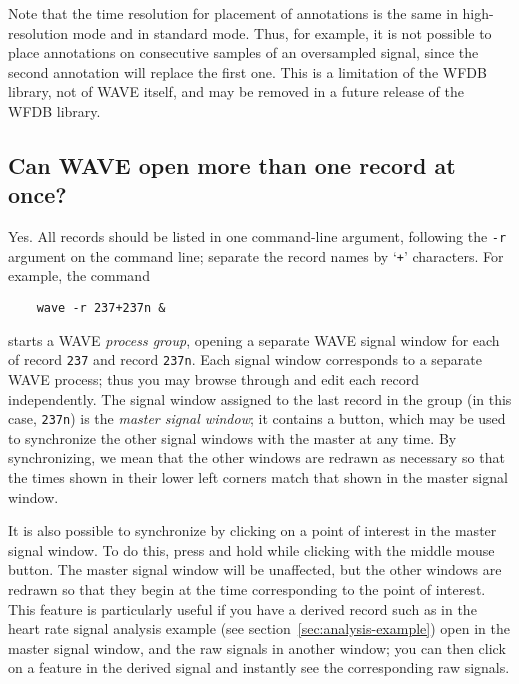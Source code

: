 \documentclass[twoside]{book}
\newcommand{\keycap}[1]{\cornersize{.5}\Ovalbox{\small\sf #1}}
\newcommand{\button}[1]{\cornersize{2}\ovalbox{\rule[-.3mm]{0cm}{2.5mm}\small\sf ~#1~}}
\newcommand{\WAVE}{{\sf WAVE}\xspace}
\begin{document}
Note that the time resolution for placement of annotations is the same
in high-resolution mode and in standard mode.  Thus, for example, it
is not possible to place annotations on consecutive samples of an
oversampled signal, since the second annotation will replace the first
one.  This is a limitation of the WFDB library, not of \WAVE{} itself,
and may be removed in a future release of the WFDB library.

\subsection{Can \WAVE{} open more than one record at once?}

\index{r option for WAVE@{\tt -r} option for \WAVE{}}
Yes. All records should be listed in one command-line argument,
following the {\tt -r} argument on the command line;  separate the
record names by `{\tt +}' characters.  For example, the command
\begin{verbatim}
    wave -r 237+237n &
\end{verbatim}
starts a \WAVE{} \emph{process group}, opening a separate \WAVE{} signal
window for each of record {\tt 237} and record {\tt 237n}.  Each signal window
corresponds to a separate \WAVE{} process;  thus you may browse through and
edit each record independently.  The signal window assigned to the last record
in the group (in this case, {\tt 237n}) is the \emph{master signal window};
it contains a \button{Sync} button, which may be used to synchronize the other
signal windows with the master at any time.  By synchronizing, we mean that the
other windows are redrawn as necessary so that the times shown in their lower
left corners match that shown in the master signal window.

It is also possible to synchronize by clicking on a point of interest in the
master signal window.  To do this, press and hold \keycap{Ctrl} while clicking
with the middle mouse button.  The master signal window will be unaffected,
but the other windows are redrawn so that they begin at the time corresponding
to the point of interest.  This feature is particularly useful if you have
a derived record such as in the heart rate signal analysis example (see
section~\ref{sec:analysis-example}) open in the master signal window, and
the raw signals in another window;  you can then click on a feature in the
derived signal and instantly see the corresponding raw signals.
\end{document}
